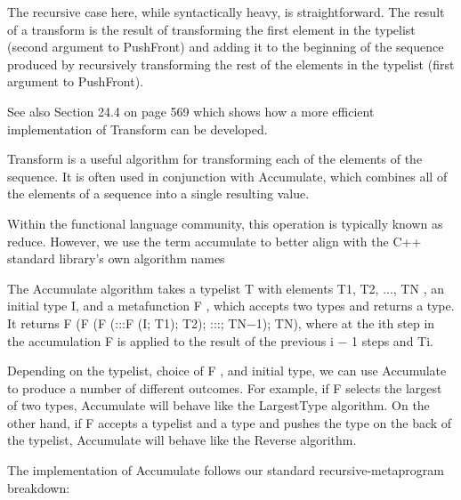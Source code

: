 The recursive case here, while syntactically heavy, is straightforward. The result of a transform is the result of transforming the first element in the typelist (second argument to PushFront) and adding it to the beginning of the sequence produced by recursively transforming the rest of the elements in the typelist (first argument to PushFront).

See also Section 24.4 on page 569 which shows how a more efficient implementation of Transform can be developed.


Transform is a useful algorithm for transforming each of the elements of the sequence. It is often used in conjunction with Accumulate, which combines all of the elements of a sequence into a single resulting value.

\begin{tcolorbox}[colback=webgreen!5!white,colframe=webgreen!75!black]
\hspace*{0.75cm}Within the functional language community, this operation is typically known as reduce. However, we use the term accumulate to better align with the C++ standard library’s own algorithm names
\end{tcolorbox}

The Accumulate algorithm takes a typelist T with elements T1, T2, ..., TN , an initial type I, and a metafunction F , which accepts two types and returns a type. It returns F (F (F (:::F (I; T1); T2); :::; TN−1); TN), where at the ith step in the accumulation F is applied to the result of the previous i − 1 steps and Ti.

Depending on the typelist, choice of F , and initial type, we can use Accumulate to produce a number of different outcomes. For example, if F selects the largest of two types, Accumulate will behave like the LargestType algorithm. On the other hand, if F accepts a typelist and a type and pushes the type on the back of the typelist, Accumulate will behave like the Reverse algorithm.

The implementation of Accumulate follows our standard recursive-metaprogram breakdown:

